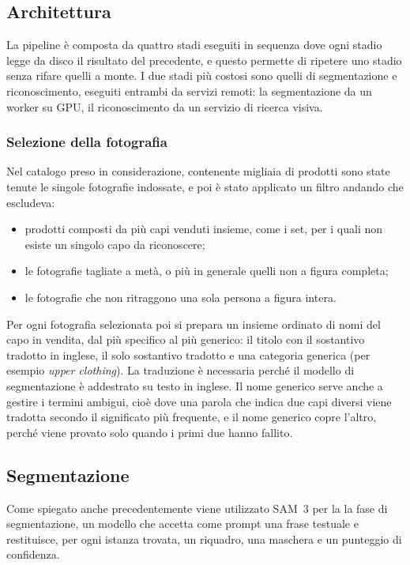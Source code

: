 \subsection{Architettura}

La pipeline è composta da quattro stadi eseguiti in sequenza dove ogni stadio legge da disco il risultato del precedente, e questo permette di ripetere uno stadio
senza rifare quelli a monte. I due stadi più costosi sono quelli di segmentazione e riconoscimento, eseguiti entrambi da servizi remoti: la segmentazione
da un worker su GPU, il riconoscimento da un servizio di ricerca visiva.

\subsubsection{Selezione della fotografia}

Nel catalogo preso in considerazione, contenente migliaia di prodotti sono state tenute le singole fotografie indossate,
e poi è stato applicato un filtro andando che escludeva:
\begin{itemize}
  \item prodotti composti da più capi venduti insieme, come i set, per i quali
    non esiste un singolo capo da riconoscere;
  \item le fotografie tagliate a metà, o più in generale quelli non a figura completa;
  \item le fotografie che non ritraggono una sola persona a figura intera.
\end{itemize}

\noindent
Per ogni fotografia selezionata poi si prepara un insieme ordinato di nomi del capo in vendita, dal più specifico al più generico: il titolo con il sostantivo tradotto in inglese, il solo sostantivo tradotto e una categoria generica (per esempio \textit{upper clothing}). La traduzione è necessaria perché il modello di segmentazione è addestrato su testo in inglese.
Il nome generico serve anche a gestire i termini ambigui, cioè dove una parola che indica due capi diversi viene tradotta secondo il significato più frequente, e il nome generico copre l'altro, perché viene provato solo quando i primi due hanno fallito.

\subsection{Segmentazione}

Come spiegato anche precedentemente viene utilizzato SAM~3 per la la fase di segmentazione, un modello che accetta come prompt una frase testuale e restituisce, per ogni istanza trovata, un riquadro, una maschera e un punteggio di confidenza.

